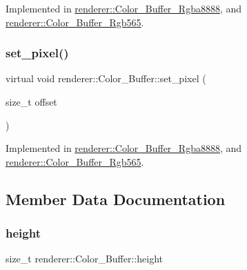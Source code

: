 Implemented in \mbox{\hyperlink{classrenderer_1_1_color___buffer___rgba8888_aaebcb0ce419750f0673fc9d3c59b929d}{renderer\+::\+Color\+\_\+\+Buffer\+\_\+\+Rgba8888}}, and \mbox{\hyperlink{classrenderer_1_1_color___buffer___rgb565_ab3f0706720c48f42cbc8aa771ea3178e}{renderer\+::\+Color\+\_\+\+Buffer\+\_\+\+Rgb565}}.

\mbox{\label{classrenderer_1_1_color___buffer_a02e8a2b93f5d95f10e2aedd24ee02625}} 
\subsubsection{\texorpdfstring{set\_pixel()}{set\_pixel()}\hspace{0.1cm}{\footnotesize\ttfamily [2/2]}}
{\footnotesize\ttfamily virtual void renderer\+::\+Color\+\_\+\+Buffer\+::set\+\_\+pixel (\begin{DoxyParamCaption}\item[{size\+\_\+t}]{offset }\end{DoxyParamCaption})\hspace{0.3cm}{\ttfamily [pure virtual]}}



Implemented in \mbox{\hyperlink{classrenderer_1_1_color___buffer___rgba8888_a99589bff538769aa5b0923274dc324cb}{renderer\+::\+Color\+\_\+\+Buffer\+\_\+\+Rgba8888}}, and \mbox{\hyperlink{classrenderer_1_1_color___buffer___rgb565_af07fc1066c1654ed887952db87a8869a}{renderer\+::\+Color\+\_\+\+Buffer\+\_\+\+Rgb565}}.



\subsection{Member Data Documentation}
\mbox{\label{classrenderer_1_1_color___buffer_a9a26f6f8e04447ac2b26c38e0a190714}} 
\subsubsection{\texorpdfstring{height}{height}}
{\footnotesize\ttfamily size\+\_\+t renderer\+::\+Color\+\_\+\+Buffer\+::height\hspace{0.3cm}{\ttfamily [protected]}}



